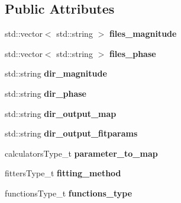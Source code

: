 \subsection*{Public Attributes}
\begin{DoxyCompactItemize}
\item 
\hypertarget{struct_ox_1_1_tomato_options_ad123055506ec1c4c73b397a5f771d2e7}{std\-::vector$<$ std\-::string $>$ {\bfseries files\-\_\-magnitude}}\label{struct_ox_1_1_tomato_options_ad123055506ec1c4c73b397a5f771d2e7}

\item 
\hypertarget{struct_ox_1_1_tomato_options_acd13f26343647d05164a33cb5b4163f3}{std\-::vector$<$ std\-::string $>$ {\bfseries files\-\_\-phase}}\label{struct_ox_1_1_tomato_options_acd13f26343647d05164a33cb5b4163f3}

\item 
\hypertarget{struct_ox_1_1_tomato_options_aeffcb3fc69397596ce852699a2f3b05d}{std\-::string {\bfseries dir\-\_\-magnitude}}\label{struct_ox_1_1_tomato_options_aeffcb3fc69397596ce852699a2f3b05d}

\item 
\hypertarget{struct_ox_1_1_tomato_options_a92cabcc150b94b5b4c3dbea6e8ecb846}{std\-::string {\bfseries dir\-\_\-phase}}\label{struct_ox_1_1_tomato_options_a92cabcc150b94b5b4c3dbea6e8ecb846}

\item 
\hypertarget{struct_ox_1_1_tomato_options_af31a50b6e23004912a1512812c823a29}{std\-::string {\bfseries dir\-\_\-output\-\_\-map}}\label{struct_ox_1_1_tomato_options_af31a50b6e23004912a1512812c823a29}

\item 
\hypertarget{struct_ox_1_1_tomato_options_ab8e2816968affd97a0ba0b13c44c4c02}{std\-::string {\bfseries dir\-\_\-output\-\_\-fitparams}}\label{struct_ox_1_1_tomato_options_ab8e2816968affd97a0ba0b13c44c4c02}

\item 
\hypertarget{struct_ox_1_1_tomato_options_a0d4ad4476a8817e68ead08d1b0645033}{calculators\-Type\-\_\-t {\bfseries parameter\-\_\-to\-\_\-map}}\label{struct_ox_1_1_tomato_options_a0d4ad4476a8817e68ead08d1b0645033}

\item 
\hypertarget{struct_ox_1_1_tomato_options_a2d1d2149185ef71968980cf8c6afcf14}{fitters\-Type\-\_\-t {\bfseries fitting\-\_\-method}}\label{struct_ox_1_1_tomato_options_a2d1d2149185ef71968980cf8c6afcf14}

\item 
\hypertarget{struct_ox_1_1_tomato_options_aced156934915e4bb658d9f8433f69ee2}{functions\-Type\-\_\-t {\bfseries functions\-\_\-type}}\label{struct_ox_1_1_tomato_options_aced156934915e4bb658d9f8433f69ee2}


\end{DoxyCompactItemize}

